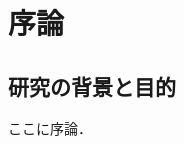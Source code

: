 \documentclass[a4paper,10pt, uplatex, report, openany]{jsbook}
\begin{document}
\setcounter{section}{0}
\chapter{序論}
\section{研究の背景と目的}
ここに序論．
\end{document}
